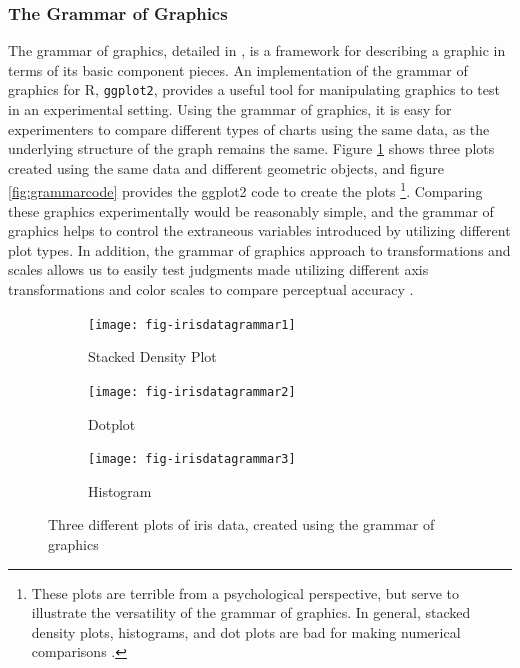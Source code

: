 \documentclass[11pt]{isuthesis}\usepackage[]{graphicx}\usepackage[]{color}
\begin{document}
\subsubsection{The Grammar of Graphics}
The grammar of graphics, detailed in \citet{wilkinson2006grammar}, is a framework for describing a graphic in terms of its basic component pieces. An implementation of the grammar of graphics for R, \texttt{ggplot2}\citep{ggplot2, wickham2010layered}, provides a useful tool for manipulating graphics to test in an experimental setting. Using the grammar of graphics, it is easy for experimenters to compare different types of charts using the same data, as the underlying structure of the graph remains the same. Figure \ref{fig:grammarplots} shows three plots created using the same data and different geometric objects, and figure \ref{fig:grammarcode} provides the ggplot2 code to create the plots \footnote{These plots are terrible from a psychological perspective, but serve to illustrate the versatility of the grammar of graphics. In general, stacked density plots, histograms, and dot plots are bad for making numerical comparisons \citep{cleveland:1985}.}. Comparing these graphics experimentally would be reasonably simple, and the grammar of graphics helps to control the extraneous variables introduced by utilizing different plot types. In addition, the grammar of graphics approach to transformations and scales allows us to easily test judgments made utilizing different axis transformations and color scales to compare perceptual accuracy \citep{hofmann2012graphical}. 



\begin{figure}[htbp]\centering
\begin{subfigure}[b]{.33\linewidth}\centering
  \texttt{[image: fig-irisdatagrammar1]}
  \caption{Stacked Density Plot}
\end{subfigure}\hfill
\begin{subfigure}[b]{.33\linewidth}\centering
  \texttt{[image: fig-irisdatagrammar2]}
  \caption{Dotplot}
\end{subfigure}\hfill
\begin{subfigure}[b]{.33\linewidth}\centering
  \texttt{[image: fig-irisdatagrammar3]}
  \caption{Histogram}
\end{subfigure}\hfill
\caption{Three different plots of iris data, created using the grammar of graphics}\label{fig:grammarplots}
\end{figure}
\end{document}
